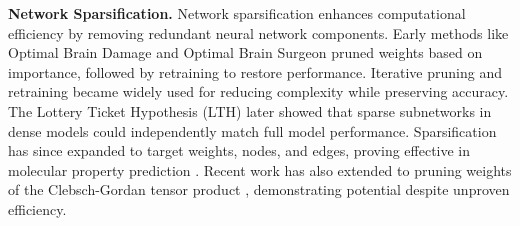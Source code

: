 \textbf{Network Sparsification.} Network sparsification enhances computational efficiency by removing redundant neural network components. Early methods like Optimal Brain Damage \cite{lecun1990optimal} and Optimal Brain Surgeon \cite{hassibi1993second} pruned weights based on importance, followed by retraining to restore performance. Iterative pruning and retraining \cite{han2015learning} became widely used for reducing complexity while preserving accuracy. The Lottery Ticket Hypothesis (LTH) \cite{frankle2018lottery} later showed that sparse subnetworks in dense models could independently match full model performance. Sparsification has since expanded to target weights, nodes, and edges, proving effective in molecular property prediction \cite{liu2023comprehensive,peng2022towards}. Recent work has also extended to pruning weights of the Clebsch-Gordan tensor product \cite{wang2023towards}, demonstrating potential despite unproven efficiency.
